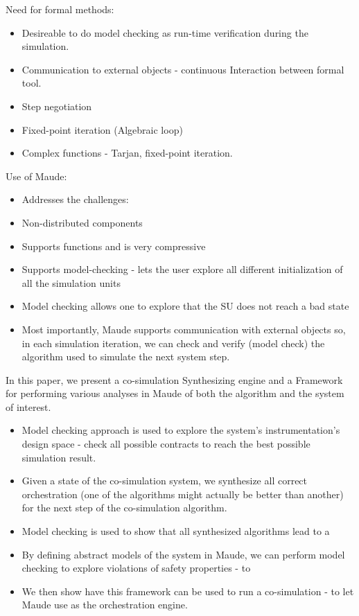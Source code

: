   Need for formal methods:
  \begin{itemize}
    \item Desireable to do model checking as run-time verification during the simulation.
    \item Communication to external objects - continuous Interaction between formal tool.
    \item Step negotiation
    \item Fixed-point iteration (Algebraic loop)
    \item Complex functions - Tarjan, fixed-point iteration.
  \end{itemize}
  

  
  Use of Maude:
  \begin{itemize}
    \item Addresses the challenges:
    \item Non-distributed components
    \item Supports functions and is very compressive
    \item Supports model-checking - lets the user explore all different initialization of all the simulation units
    \item Model checking allows one to explore that the SU does not reach a bad state
    \item Most importantly, Maude supports communication with external objects so, in each simulation iteration, we can check and verify (model check) the algorithm used to simulate the next system step.
  \end{itemize}
  
  In this paper, we present a co-simulation Synthesizing engine and a Framework for performing various analyses in Maude of both the algorithm and the system of interest.
  \begin{itemize}
    \item Model checking approach is used to explore the system's instrumentation's design space - check all possible contracts to reach the best possible simulation result.
    \item Given a state of the co-simulation system, we synthesize all correct orchestration (one of the algorithms might actually be better than another) for the next step of the co-simulation algorithm.
    \item Model checking is used to show that all synthesized algorithms lead to a  
    \item By defining abstract models of the system in Maude, we can perform model checking to explore violations of safety properties - to 
    \item We then show have this framework can be used to run a co-simulation - to let Maude use as the orchestration engine.
  \end{itemize}
  
